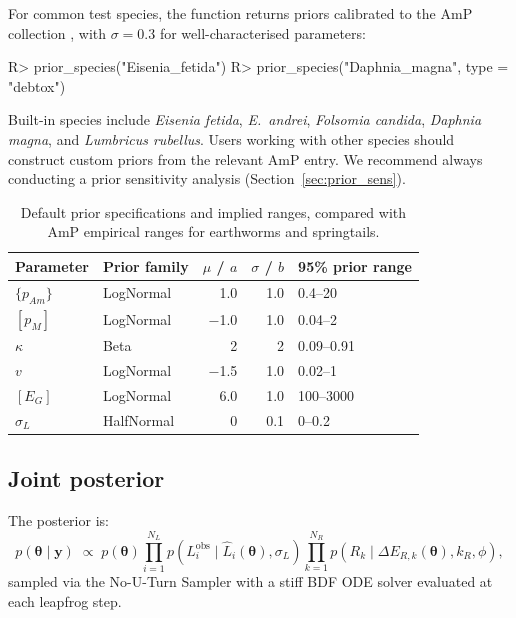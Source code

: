 \documentclass[article,shortnames]{jss}
\newcommand{\pAm}{\{p_{Am}\}}
\newcommand{\pM}{[p_M]}
\newcommand{\EG}{[E_G]}
\begin{document}
For common test species, the function  returns
priors calibrated to the AmP collection \citep{MarquesAmP2018},
with $\sigma = 0.3$ for well-characterised parameters:
\begin{CodeChunk}
\begin{CodeInput}
R> prior_species("Eisenia_fetida")
R> prior_species("Daphnia_magna", type = "debtox")
\end{CodeInput}
\end{CodeChunk}
\noindent
Built-in species include \emph{Eisenia fetida}, \emph{E.~andrei},
\emph{Folsomia candida}, \emph{Daphnia magna}, and
\emph{Lumbricus rubellus}.  Users working with other species should
construct custom priors from the relevant AmP entry.  We recommend
always conducting a prior sensitivity analysis
(Section~\ref{sec:prior_sens}).

\begin{table}[t!]
\centering
\caption{Default prior specifications and implied ranges, compared
  with AmP empirical ranges for earthworms and springtails.}
\label{tab:priors}
\begin{tabular}{llrrl}
\toprule
Parameter & Prior family & $\mu$ / $a$ & $\sigma$ / $b$ &
  95\% prior range \\
\midrule
$\pAm$    & LogNormal & 1.0  & 1.0  & 0.4--20 \\
$\pM$     & LogNormal & $-$1.0 & 1.0 & 0.04--2 \\
$\kappa$  & Beta      & 2    & 2    & 0.09--0.91 \\
$v$       & LogNormal & $-$1.5 & 1.0 & 0.02--1 \\
$\EG$     & LogNormal & 6.0  & 1.0  & 100--3000 \\
$\sigma_L$ & HalfNormal & 0 & 0.1 & 0--0.2 \\
\bottomrule
\end{tabular}
\end{table}

\subsection{Joint posterior}

The posterior is:
\begin{equation}
  p(\boldsymbol{\theta} \mid \mathbf{y}) \;\propto\;
  p(\boldsymbol{\theta}) \prod_{i=1}^{N_L}
  p(L_i^{\mathrm{obs}} \mid \hat{L}_i(\boldsymbol{\theta}), \sigma_L)
  \prod_{k=1}^{N_R}
  p(R_k \mid \Delta E_{R,k}(\boldsymbol{\theta}), k_R, \phi),
  \label{eq:posterior}
\end{equation}
sampled via the No-U-Turn Sampler \citep[NUTS;][]{HoffmanNUTS2014}
with a stiff BDF ODE solver evaluated at each leapfrog step.
\end{document}
